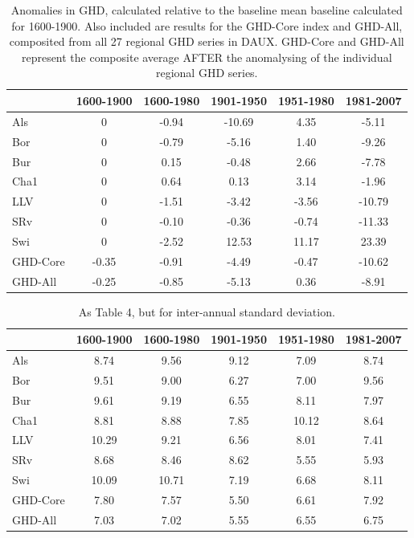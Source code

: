 \documentclass[12pt]{article}
\begin{document}
\begin{table}
\small
\caption{\small Anomalies in GHD, calculated relative to the baseline mean baseline calculated for 1600-1900. Also included are results for the GHD-Core index and GHD-All, composited from all 27 regional GHD series in DAUX. GHD-Core and GHD-All represent the composite average AFTER the anomalysing of the individual regional GHD series.}
\centering
\begin{tabular}{l c c c c c}
\hline
& \bf 1600-1900 & \bf 1600-1980 & \bf 1901-1950 & \bf 1951-1980 & \bf 1981-2007\\
\hline
Als	& 0	& -0.94 & -10.69 & 4.35 & -5.11\\
Bor	& 0 & -0.79 & -5.16 & 1.40 & -9.26\\
Bur	& 0	& 0.15	& -0.48	& 2.66	& -7.78\\
Cha1	& 0	& 0.64	& 0.13	& 3.14	& -1.96\\
LLV	& 0	& -1.51	& -3.42	& -3.56	& -10.79\\
SRv & 0	& -0.10	& -0.36	& -0.74	& -11.33\\
Swi	& 0	& -2.52	& 12.53	& 11.17	& 23.39\\
\hline
GHD-Core & -0.35 & -0.91	& -4.49 & -0.47 & 	-10.62\\
GHD-All	& -0.25 & -0.85 & -5.13 & 0.36 & -8.91\\
\hline
\end{tabular}
\end{table}

\begin{table}
\small
\caption{\small As Table 4, but for inter-annual standard deviation.}
\centering
\begin{tabular}{l c c c c c}
\hline
& \bf 1600-1900 & \bf 1600-1980 & \bf 1901-1950 & \bf 1951-1980 & \bf 1981-2007\\
\hline
Als	& 8.74	& 9.56	& 9.12	& 7.09	& 8.74\\
Bor	& 9.51	& 9.00	& 6.27	& 7.00	& 9.56\\
Bur	& 9.61 & 9.19 & 6.55 & 8.11 & 7.97\\
Cha1 & 8.81 & 8.88 & 7.85 & 10.12 & 8.64\\
LLV	& 10.29 & 9.21 & 6.56 & 8.01 & 7.41\\
SRv & 8.68 & 8.46 & 8.62 & 5.55 & 5.93\\
Swi	& 10.09	& 10.71	& 7.19	& 6.68	& 8.11\\
\hline
GHD-Core & 7.80 & 7.57	& 5.50	& 6.61	& 7.92\\
GHD-All	& 7.03 & 7.02 & 5.55 & 6.55 & 6.75\\
\hline
\end{tabular}
\end{table}
\end{document}
